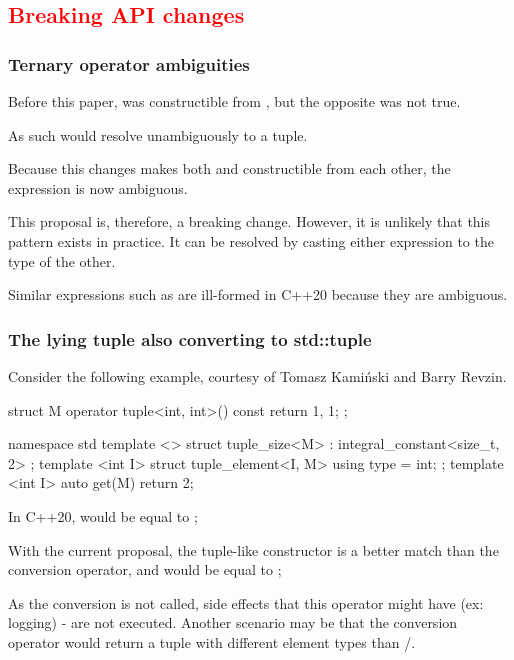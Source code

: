 \documentclass{wg21}
\begin{document}
\subsection{\textcolor{Red}{Breaking API changes}}

\subsubsection{Ternary operator ambiguities}

Before this paper,  was constructible from ,
but the opposite was not true.

As such  would resolve unambiguously to a tuple.

Because this changes makes both  and  constructible from each other,
the expression is now ambiguous.

This proposal is, therefore, a breaking change.
However, it is unlikely that this pattern exists in practice.
It can be resolved by casting either expression to the type of the other.

Similar expressions such as  are ill-formed in C++20 because they are ambiguous.

\subsubsection{The lying tuple also converting to std::tuple}

Consider the following example, courtesy of Tomasz Kamiński and Barry Revzin.

\begin{colorblock}
    struct M {
        operator tuple<int, int>() const { return {1, 1}; }
    };
    
    namespace std {
        template <> struct tuple_size<M> : integral_constant<size_t, 2> { };
        template <int I> struct tuple_element<I, M> { using type = int; };
        template <int I> auto get(M) { return 2; }
    }
\end{colorblock}

In C++20,  would be equal to ;

With the current proposal, the tuple-like constructor is a better match than the conversion operator, and
 would be equal to ;

As the conversion is not called, side effects that this operator might have (ex: logging) - are not executed.
Another scenario may be that the conversion operator would return a tuple with different element types than /.
\end{document}

